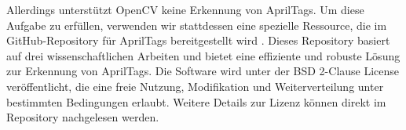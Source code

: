 Allerdings unterstützt OpenCV keine Erkennung von AprilTags. Um diese Aufgabe zu erfüllen, verwenden 
wir stattdessen eine spezielle Ressource, die im GitHub-Repository für AprilTags bereitgestellt 
wird \cite{apriltag_github}. Dieses Repository basiert auf drei wissenschaftlichen Arbeiten 
\cite{olson2011tags} \cite{wang2016iros} \cite{krogius2019iros} und bietet eine effiziente 
und robuste Lösung zur Erkennung von AprilTags. Die Software wird unter der BSD 2-Clause License 
veröffentlicht, die eine freie Nutzung, Modifikation und Weiterverteilung unter bestimmten Bedingungen 
erlaubt. Weitere Details zur Lizenz können direkt im Repository nachgelesen werden.